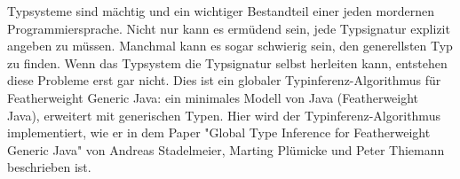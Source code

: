 Typsysteme sind mächtig und ein wichtiger Bestandteil einer jeden mordernen Programmiersprache.
Nicht nur kann es ermüdend sein, jede Typsignatur explizit angeben zu müssen. Manchmal kann es sogar schwierig sein, den generellsten Typ zu finden.
Wenn das Typsystem die Typsignatur selbst herleiten kann, entstehen diese Probleme erst gar nicht.
Dies ist ein globaler Typinferenz-Algorithmus für Featherweight Generic Java: ein minimales Modell von Java (Featherweight Java), erweitert mit generischen Typen.
Hier wird der Typinferenz-Algorithmus implementiert, wie er in dem Paper "Global Type Inference for Featherweight Generic Java" von Andreas Stadelmeier, Marting Plümicke und Peter Thiemann beschrieben ist.

